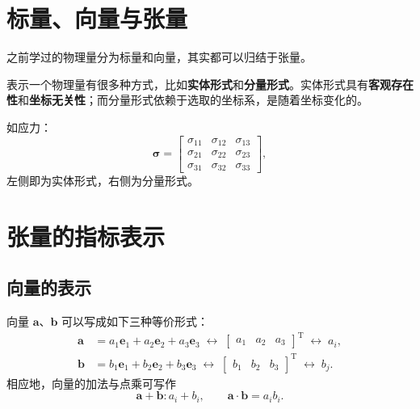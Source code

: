 
\section{标量、向量与张量}

之前学过的物理量分为标量和向量，其实都可以归结于张量。

表示一个物理量有很多种方式，比如\textbf{实体形式}和\textbf{分量形式}。实体形式具有\textbf{客观存在性}和\textbf{坐标无关性}；而分量形式依赖于选取的坐标系，是随着坐标变化的。

如应力：
\begin{equation}
	\boldsymbol{\sigma}=
	\begin{bmatrix}
		\sigma_{11} & \sigma_{12} & \sigma_{13} \\
		\sigma_{21} & \sigma_{22} & \sigma_{23} \\
		\sigma_{31} & \sigma_{32} & \sigma_{33}
	\end{bmatrix},
	\label{eq:应力张量表示}
\end{equation}
左侧即为实体形式，右侧为分量形式。

\section{张量的指标表示}

\subsection{向量的表示}

向量 $\boldsymbol{a}$、$\boldsymbol{b}$ 可以写成如下三种等价形式：
\begin{equation}
	\begin{aligned}
		\boldsymbol{a} & =a_{1}\boldsymbol{e}_{1}+a_{2}\boldsymbol{e}_{2}+a_{3}\boldsymbol{e}_{3}
		\;\longleftrightarrow\;
		\begin{bmatrix} a_{1} & a_{2} & a_{3} \end{bmatrix}^{\mathrm{T}}
		\;\longleftrightarrow\;
		a_{i}, \\[4pt]
		\boldsymbol{b} & =b_{1}\boldsymbol{e}_{1}+b_{2}\boldsymbol{e}_{2}+b_{3}\boldsymbol{e}_{3}
		\;\longleftrightarrow\;
		\begin{bmatrix} b_{1} & b_{2} & b_{3} \end{bmatrix}^{\mathrm{T}}
		\;\longleftrightarrow\;
		b_{j}.
	\end{aligned}
	\label{eq:向量指标表示}
\end{equation}
相应地，向量的加法与点乘可写作
\begin{equation}
	\boldsymbol{a}+\boldsymbol{b}:a_{i}+b_{i},\qquad
	\boldsymbol{a}\cdot\boldsymbol{b}=a_{i}b_{i}.
	\label{eq:向量运算指标表示}
\end{equation}

